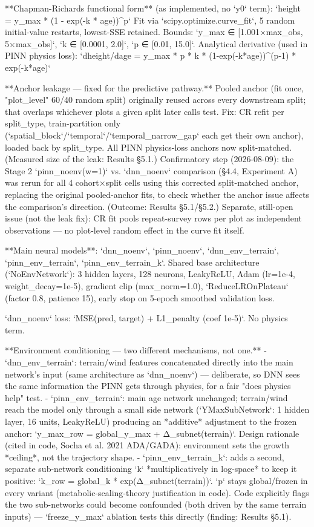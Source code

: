 **Chapman-Richards functional form** (as implemented, no `y0` term):
`height = y_max * (1 - exp(-k * age))^p`
Fit via `scipy.optimize.curve_fit`, 5 random initial-value restarts, lowest-SSE retained. Bounds: `y_max ∈ [1.001×max_obs, 5×max_obs]`, `k ∈ [0.0001, 2.0]`, `p ∈ [0.01, 15.0]`.
Analytical derivative (used in PINN physics loss):
`dheight/dage = y_max * p * k * (1-exp(-k*age))^(p-1) * exp(-k*age)`

**Anchor leakage — fixed for the predictive pathway.** Pooled anchor (fit once, "plot_level" 60/40 random split) originally reused across every downstream split; that overlaps whichever plots a given split later calls test. Fix: CR refit per split_type, train-partition only (`spatial_block`/`temporal`/`temporal_narrow_gap` each get their own anchor), loaded back by split_type. All PINN physics-loss anchors now split-matched. (Measured size of the leak: Results §5.1.)
Confirmatory step (2026-08-09): the Stage 2 `pinn_noenv(w=1)` vs. `dnn_noenv` comparison (§4.4, Experiment A) was rerun for all 4 cohort×split cells using this corrected split-matched anchor, replacing the original pooled-anchor fits, to check whether the anchor issue affects the comparison's direction. (Outcome: Results §5.1/§5.2.)
Separate, still-open issue (not the leak fix): CR fit pools repeat-survey rows per plot as independent observations — no plot-level random effect in the curve fit itself.

**Main neural models**: `dnn_noenv`, `pinn_noenv`, `dnn_env_terrain`, `pinn_env_terrain`, `pinn_env_terrain_k`.
Shared base architecture (`NoEnvNetwork`): 3 hidden layers, 128 neurons, LeakyReLU, Adam (lr=1e-4, weight_decay=1e-5), gradient clip (max_norm=1.0), `ReduceLROnPlateau` (factor 0.8, patience 15), early stop on 5-epoch smoothed validation loss.

`dnn_noenv` loss: `MSE(pred, target) + L1_penalty (coef 1e-5)`. No physics term.

**Environment conditioning — two different mechanisms, not one.**
- `dnn_env_terrain`: terrain/wind features concatenated directly into the main network's input (same architecture as `dnn_noenv`) — deliberate, so DNN sees the same information the PINN gets through physics, for a fair "does physics help" test.
- `pinn_env_terrain`: main age network unchanged; terrain/wind reach the model only through a small side network (`YMaxSubNetwork`: 1 hidden layer, 16 units, LeakyReLU) producing an *additive* adjustment to the frozen anchor: `y_max_row = global_y_max + Δ_subnet(terrain)`. Design rationale (cited in code, Socha et al. 2021 ADA/GADA): environment sets the growth *ceiling*, not the trajectory shape.
- `pinn_env_terrain_k`: adds a second, separate sub-network conditioning `k` *multiplicatively in log-space* to keep it positive: `k_row = global_k * exp(Δ_subnet(terrain))`. `p` stays global/frozen in every variant (metabolic-scaling-theory justification in code). Code explicitly flags the two sub-networks could become confounded (both driven by the same terrain inputs) — `freeze_y_max` ablation tests this directly (finding: Results §5.1).

